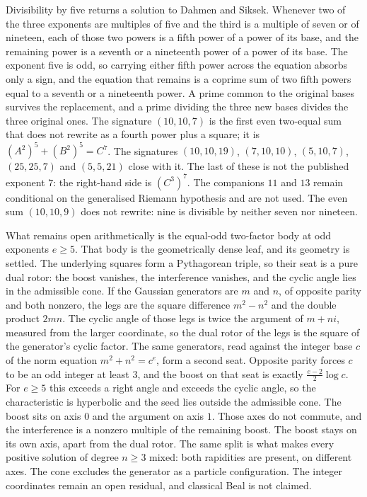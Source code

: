\documentclass[a4paper]{article}
\theoremstyle{definition}
\theoremstyle{remark}
\begin{document}
Divisibility by five returns a solution to Dahmen and Siksek. Whenever two of the three exponents are multiples of five and the third is a multiple of seven or of nineteen, each of those two powers is a fifth power of a power of its base, and the remaining power is a seventh or a nineteenth power of a power of its base. The exponent five is odd, so carrying either fifth power across the equation absorbs only a sign, and the equation that remains is a coprime sum of two fifth powers equal to a seventh or a nineteenth power. A prime common to the original bases survives the replacement, and a prime dividing the three new bases divides the three original ones. The signature \( (10,10,7) \) is the first even two-equal sum that does not rewrite as a fourth power plus a square; it is \( (A^2)^5+(B^2)^5=C^7 \). The signatures \( (10,10,19) \), \( (7,10,10) \), \( (5,10,7) \), \( (25,25,7) \) and \( (5,5,21) \) close with it. The last of these is not the published exponent \( 7 \): the right-hand side is \( (C^3)^7 \). The companions \( 11 \) and \( 13 \) remain conditional on the generalised Riemann hypothesis and are not used. The even sum \( (10,10,9) \) does not rewrite: nine is divisible by neither seven nor nineteen.

What remains open arithmetically is the equal-odd two-factor body at odd exponents \( e\ge 5 \). That body is the geometrically dense leaf, and its geometry is settled. The underlying squares form a Pythagorean triple, so their seat is a pure dual rotor: the boost vanishes, the interference vanishes, and the cyclic angle lies in the admissible cone. If the Gaussian generators are \( m \) and \( n \), of opposite parity and both nonzero, the legs are the square difference \( m^2-n^2 \) and the double product \( 2mn \). The cyclic angle of those legs is twice the argument of \( m+ni \), measured from the larger coordinate, so the dual rotor of the legs is the square of the generator's cyclic factor. The same generators, read against the integer base \( c \) of the norm equation \( m^2+n^2=c^e \), form a second seat. Opposite parity forces \( c \) to be an odd integer at least \( 3 \), and the boost on that seat is exactly \( \frac{e-2}{2}\log c \). For \( e\ge 5 \) this exceeds a right angle and exceeds the cyclic angle, so the characteristic is hyperbolic and the seed lies outside the admissible cone. The boost sits on axis \( 0 \) and the argument on axis \( 1 \). Those axes do not commute, and the interference is a nonzero multiple of the remaining boost. The boost stays on its own axis, apart from the dual rotor. The same split is what makes every positive solution of degree \( n\ge 3 \) mixed: both rapidities are present, on different axes. The cone excludes the generator as a particle configuration. The integer coordinates remain an open residual, and classical Beal is not claimed.
\end{document}

